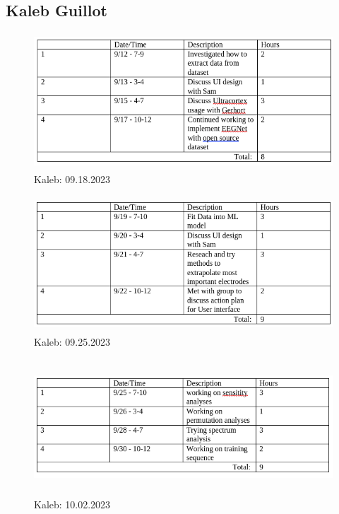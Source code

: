 \documentclass[conference]{IEEEtran}
\begin{document}
\subsection{Kaleb Guillot}
    \begin{figure}[htbp]
                \centerline{\includegraphics[height=2in,keepaspectratio]{figs/I/K_09.18.2023.png}}
                \caption{Kaleb: 09.18.2023}
                \label{Fig:K_09.18.2023}
    \end{figure} 
    \begin{figure}[htbp]
                \centerline{\includegraphics[height=2in,keepaspectratio]{figs/I/K_09.25.2023.png}}
                \caption{Kaleb: 09.25.2023}
                \label{Fig:K_09.25.2023}
    \end{figure} 
    \begin{figure}[htbp]
                \centerline{\includegraphics[height=2in,keepaspectratio]{figs/I/K_10.02.2023.png}}
                \caption{Kaleb: 10.02.2023}
                \label{Fig:K_10.02.2023}
    \end{figure} 
\end{document}
